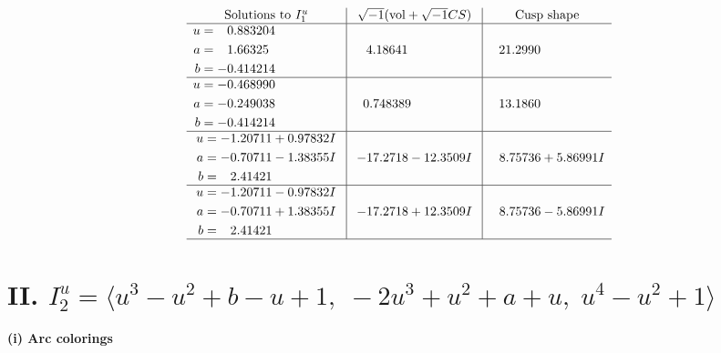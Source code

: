 \documentclass[1p]{elsarticle_modified}
\theoremstyle{definition}
\newcommand{\I}{\sqrt{-1}}
\begin{document}
$$\begin{array}{c|c|c}  
\text{Solutions to }I^u_{1}& \I (\text{vol} + \sqrt{-1}CS) & \text{Cusp shape}\\
 \hline 
\begin{aligned}
u &= \phantom{-}0.883204\phantom{ +0.000000I} \\
a &= \phantom{-}1.66325\phantom{ +0.000000I} \\
b &= -0.414214\phantom{ +0.000000I}\end{aligned}
 & \phantom{-}4.18641\phantom{ +0.000000I} & \phantom{-}21.2990\phantom{ +0.000000I} \\ \hline\begin{aligned}
u &= -0.468990\phantom{ +0.000000I} \\
a &= -0.249038\phantom{ +0.000000I} \\
b &= -0.414214\phantom{ +0.000000I}\end{aligned}
 & \phantom{-}0.748389\phantom{ +0.000000I} & \phantom{-}13.1860\phantom{ +0.000000I} \\ \hline\begin{aligned}
u &= -1.20711 + 0.97832 I \\
a &= -0.70711 - 1.38355 I \\
b &= \phantom{-}2.41421\phantom{ +0.000000I}\end{aligned}
 & -17.2718 - 12.3509 I & \phantom{-}8.75736 + 5.86991 I \\ \hline\begin{aligned}
u &= -1.20711 - 0.97832 I \\
a &= -0.70711 + 1.38355 I \\
b &= \phantom{-}2.41421\phantom{ +0.000000I}\end{aligned}
 & -17.2718 + 12.3509 I & \phantom{-}8.75736 - 5.86991 I\\
 \hline 
 \end{array}$$\newpage\newpage\renewcommand{\arraystretch}{1}
\centering \section*{II. $I^u_{2}= \langle u^3- u^2+b- u+1,\;-2 u^3+u^2+a+u,\;u^4- u^2+1 \rangle$}
\flushleft \textbf{(i) Arc colorings}\\
\end{document}

